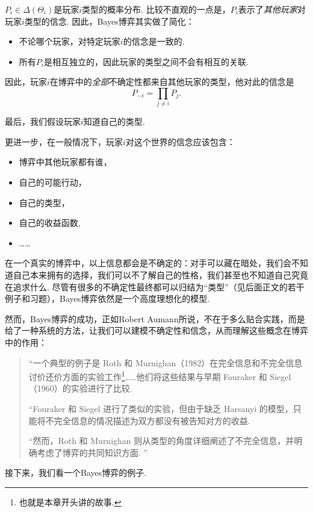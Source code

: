 $P_i\in\Delta(\Theta_i)$是玩家$i$类型的概率分布. 比较不直观的一点是，$P_i$表示了\textit{其他玩家}对玩家$i$类型的信念. 因此，Bayes博弈其实做了简化：
\begin{itemize}
    \item 不论哪个玩家，对特定玩家$i$的信念是一致的.
    \item 所有$P_i$是相互独立的，因此玩家的类型之间不会有相互的关联. 
\end{itemize}
因此，玩家$i$在博弈中的\textit{全部}不确定性都来自其他玩家的类型，他对此的信念是
\[P_{-i}=\prod_{j\neq i}P_j.\]

最后，我们假设玩家$i$知道自己的类型.

更进一步，在一般情况下，玩家$i$对这个世界的信念应该包含：
\begin{itemize}
    \item 博弈中其他玩家都有谁，
    \item 自己的可能行动，
    \item 自己的类型，
    \item 自己的收益函数,
    \item ……
\end{itemize}
在一个真实的博弈中，以上信息都会是不确定的：对手可以藏在暗处，我们会不知道自己本来拥有的选择，我们可以不了解自己的性格，我们甚至也不知道自己究竟在追求什么. 尽管有很多的不确定性最终都可以归结为“类型”（见后面正文的若干例子和习题），Bayes博弈依然是一个高度理想化的模型. 

然而，Bayes博弈的成功，正如Robert Aumann所说，不在于多么贴合实践，而是给了一种系统的方法，让我们可以建模不确定性和信念，从而理解这些概念在博弈中的作用：
\begin{quotation}
    “一个典型的例子是 Roth 和 Murnighan（1982）在完全信息和不完全信息讨价还价方面的实验工作\footnote{也就是本章开头讲的故事. }……他们将这些结果与早期 Fouraker 和 Siegel（1960）的实验进行了比较. 

    “Fouraker 和 Siegel 进行了类似的实验，但由于缺乏 Harsanyi 的模型，只能将不完全信息的情况描述为双方都没有被告知对方的收益. 
    
    “然而，Roth 和 Murnighan 则从类型的角度详细阐述了不完全信息，并明确考虑了博弈的共同知识方面. ”
\end{quotation}

接下来，我们看一个Bayes博弈的例子. 


